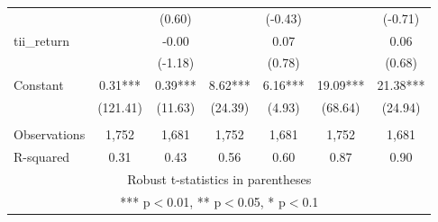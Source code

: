 \documentclass[]{article}
\begin{document}
\begin{tabular}{lcccccc}
 &  & (0.60) &  & (-0.43) &  & (-0.71) \\
tii\_return &  & -0.00 &  & 0.07 &  & 0.06 \\
 &  & (-1.18) &  & (0.78) &  & (0.68) \\
Constant & 0.31*** & 0.39*** & 8.62*** & 6.16*** & 19.09*** & 21.38*** \\
 & (121.41) & (11.63) & (24.39) & (4.93) & (68.64) & (24.94) \\
 &  &  &  &  &  &  \\
Observations & 1,752 & 1,681 & 1,752 & 1,681 & 1,752 & 1,681 \\
 R-squared & 0.31 & 0.43 & 0.56 & 0.60 & 0.87 & 0.90 \\ \hline
\multicolumn{7}{c}{ Robust t-statistics in parentheses} \\
\multicolumn{7}{c}{ *** p$<$0.01, ** p$<$0.05, * p$<$0.1} \\
\end{tabular}
\end{document}
